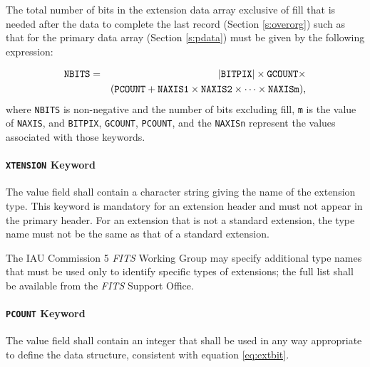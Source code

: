  The total number of bits in the extension data array 
 exclusive of fill that is needed after the data to complete the last record 
 (Section \ref{s:overorg}) such as that for the 
 primary data array 
 (Section \ref{s:pdata}) must be given by the
 following expression:

\begin{eqnarray}  
   \mbox{{\tt NBITS}} &=&  
                     |\mbox{{\tt BITPIX}}| \times \label{eq:extbit}
                      \mbox{{\tt GCOUNT}} \times \nonumber \\
                & &  (\mbox{{\tt PCOUNT}} + \mbox{{\tt NAXIS1}} \times 
                 \mbox{{\tt NAXIS2}} \times  \cdots \times \mbox{{\tt
NAXISm}}),
\end{eqnarray}
 \noindent
 where {\tt NBITS} is
 non-negative and the number of bits excluding fill, 
 {\tt m} is the value of {\tt NAXIS}, and
 {\tt BITPIX}, {\tt GCOUNT}, 
 {\tt PCOUNT}, and the {\tt NAXISn}
represent
 the values associated with those keywords.          
     
   \paragraph{{\tt XTENSION} Keyword}
 The value field shall contain a character string
 giving
 the name of the extension type.  This keyword is
 mandatory for an extension header and must not appear
 in the primary header.  
 For an extension that is not a
 standard extension, the type name must not 
 be the same as that of a standard extension. 

 The IAU Commission 5 {\em FITS\/} Working Group
 may specify additional 
 type names that must be used only to identify
 specific types of extensions; the full list shall be available from 
 the {\em FITS\/} Support Office.
  
   \paragraph{{\tt PCOUNT} Keyword}
 The value field shall contain an integer that shall be
 used in any way appropriate to define the data structure,
 consistent with equation \ref{eq:extbit}. 
  
